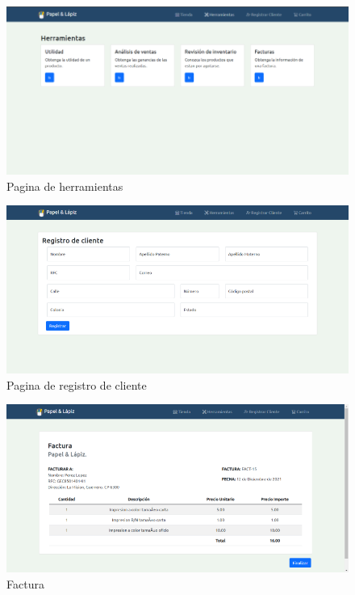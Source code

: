 \documentclass[12pt,letterpaper]{article}
\begin{document}
	\begin{figure}[H]
		\centering
		\includegraphics[scale=0.50]{Documentacion/img/herramientas.png}
		\caption{Pagina de herramientas}
	\end{figure}
	
	\begin{figure}[H]
		\centering
		\includegraphics[scale=0.50]{Documentacion/img/registro_Cliente.png}
		\caption{Pagina de registro de cliente}
	\end{figure}
	
	\begin{figure}[H]
		\centering
		\includegraphics[scale=0.50]{Documentacion/img/fac.png}
		\caption{Factura}
	\end{figure}
	
\end{document}
